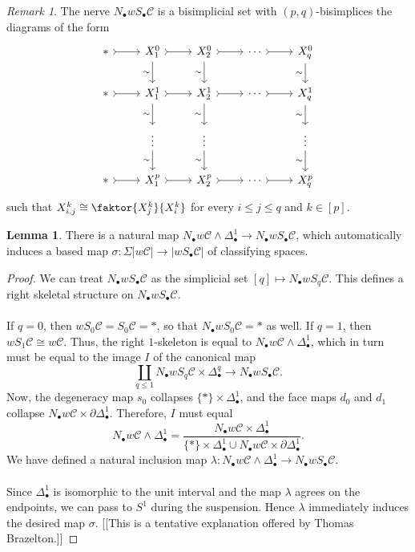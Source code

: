 \documentclass[10pt,letterpaper,cm]{nupset}
\theoremstyle{definition}
\theoremstyle{theorem}
\newtheorem{lemma}[theorem]{Lemma}
\theoremstyle{remark}
\newtheorem{remark}{Remark}
\newcommand{\1}{\mathbf{1}}
\renewcommand{\c}{\mathscr{C}}
\newcommand{\0}{\vec 0}
\begin{document}
\begin{remark}
The nerve $N_{\bullet}w S_{\bullet}\c$ is a bisimplicial set with $(p,q)$-bisimplices the diagrams of the form
\[
\begin{tikzcd}
\ast \arrow[r, tail] & X_1^0 \arrow[d, "\sim"'] \arrow[r, tail] & X_2^0 \arrow[r, tail] \arrow[d, "\sim"'] & \cdots \arrow[r, tail] & X_q^0 \arrow[d, "\sim"'] \\
\ast \arrow[r, tail] & X_1^1 \arrow[d, "\sim"'] \arrow[r, tail] & X_2^1 \arrow[r, tail] \arrow[d, "\sim"'] & \cdots \arrow[r, tail] & X_q^1 \arrow[d, "\sim"'] \\
 & \vdots \arrow[d, "\sim"'] & \vdots \arrow[d, "\sim"'] &  & \vdots \arrow[d, "\sim"'] \\
\ast \arrow[r, tail] & X_1^p \arrow[r, tail] & X_2^p \arrow[r, tail] & \cdots \arrow[r, tail] & X_q^p
\end{tikzcd}
\]
such that $X^k_{i,j} \cong \faktor{X_j^k}{X_i^k}$ for every $i\leq j\leq q$ and $k\in [p]$. 
\end{remark}

\begin{lemma}
There is a natural map $N_{\bullet} w \c \land \Delta_{\bullet}^1 \to N_{\bullet} w S_{\bullet} \c$, which automatically induces a based map $\sigma : \Sigma |w \c|\to |w S_{\bullet} \c|$ of classifying spaces.
\end{lemma}
\begin{proof}
We can treat $N_{\bullet} w S_{\bullet} \c$ as the simplicial set $[q] \mapsto N_{\bullet} w S_q \c$. This defines a right skeletal structure on $N_{\bullet} w S_{\bullet} \c$. 
\\ \\ If $q = 0$, then $w S_0 \c = S_0 \c = \ast$, so that $N_{\bullet} w S_0\c = \ast$ as well. If $q= 1$, then
$w S_1 \c \cong w \c$. Thus, the right $1$-skeleton is equal to $N_{\bullet} w \c  \land \Delta_{\bullet}^1$, which in turn must be equal to the image $I$ of the canonical map $$\coprod_{q\leq 1} N_{\bullet} w S_q \c \times \Delta_{\bullet}^q \to N_{\bullet} w S_{\bullet} \c.$$ Now, the degeneracy map $s_0$ collapses $\{\ast\} \times \Delta_{\bullet}^1$, and the face maps $d_0$ and $d_1$ collapse $ N_{\bullet} w \c \times \partial{\Delta_{\bullet}^1}$. 
Therefore, $I$ must equal $$N_{\bullet} w \c  \land \Delta_{\bullet}^1  = \frac{N_{\bullet} w \c \times \Delta_{\bullet}^1}{\{\ast\} \times \Delta_{\bullet}^1 \cup N_{\bullet} w \c \times \partial{\Delta_{\bullet}^1}}.$$  We have defined a natural inclusion map $\lambda : N_{\bullet} w \c \land \Delta_{\bullet}^1 \to  N_{\bullet} w S_{\bullet} \c$.
\\  \\ Since $\Delta_{\bullet}^1$ is isomorphic to the unit interval and the map $\lambda$ agrees on the endpoints, we can pass to $S^1$ during the suspension. Hence $\lambda$ immediately induces the desired map $\sigma$. {[[This is a tentative explanation offered by Thomas Brazelton.]]}
\end{proof}
\end{document}
